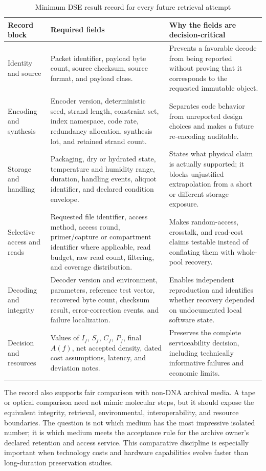 \documentclass[conference]{IEEEtran}
\begin{document}
\begin{table}[t]
\caption{Minimum DSE result record for every future retrieval attempt}
\label{tab:record}
\centering
\footnotesize
\begin{tabular}{p{}p{}p{}}
\toprule
\textbf{Record block} & \textbf{Required fields} & \textbf{Why the fields are decision-critical}\\
\midrule
Identity and source & Packet identifier, payload byte count, source checksum, source format, and payload class. & Prevents a favorable decode from being reported without proving that it corresponds to the requested immutable object.\\
Encoding and synthesis & Encoder version, deterministic seed, strand length, constraint set, index namespace, code rate, redundancy allocation, synthesis lot, and retained strand count. & Separates code behavior from unreported design choices and makes a future re-encoding auditable.\\
Storage and handling & Packaging, dry or hydrated state, temperature and humidity range, duration, handling events, aliquot identifier, and declared condition envelope. & States what physical claim is actually supported; it blocks unjustified extrapolation from a short or different storage exposure.\\
Selective access and reads & Requested file identifier, access method, access round, primer/capture or compartment identifier where applicable, read budget, raw read count, filtering, and coverage distribution. & Makes random-access, crosstalk, and read-cost claims testable instead of conflating them with whole-pool recovery.\\
Decoding and integrity & Decoder version and environment, parameters, reference test vector, recovered byte count, checksum result, error-correction events, and failure localization. & Enables independent reproduction and identifies whether recovery depended on undocumented local software state.\\
Decision and resources & Values of $I_f$, $S_f$, $C_f$, $P_f$, final $A(f)$, net accepted density, dated cost assumptions, latency, and deviation notes. & Preserves the complete serviceability decision, including technically informative failures and economic limits.\\
\bottomrule
\end{tabular}
\end{table}

The record also supports fair comparison with non-DNA archival media. A tape or optical comparison need not mimic molecular steps, but it should expose the equivalent integrity, retrieval, environmental, interoperability, and resource boundaries. The question is not which medium has the most impressive isolated number; it is which medium meets the acceptance rule for the archive owner's declared retention and access service. This comparative discipline is especially important when technology costs and hardware capabilities evolve faster than long-duration preservation studies.
\end{document}
